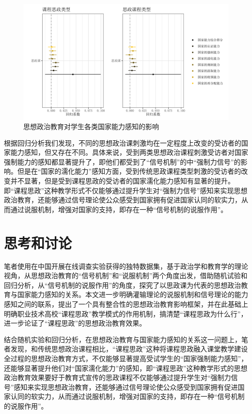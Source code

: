 \documentclass[
  12pt,
]{ctexart}
\begin{document}
\begin{figure}[h]
\includegraphics[width=1\linewidth]{../figures/all} \caption{思想政治教育对学生各类国家能力感知的影响}\label{fig:unnamed-chunk-4}
\end{figure}

根据回归分析我们发现，不同的思想政治课刺激均在一定程度上改变的受访者的国家能力感知，但又存在不同。具体来说，受到两类思想政治课程刺激受访者对国家强制能力的感知都显著提升了，即他们都受到了``信号机制''的中``强制力信号''的影响。但是在``国家的濡化能力''感知方面，受到传统思政课程类型刺激的受访者的改变并不显著，但是受到课程思政的受访者的国家濡化能力感知有显著的提升。即``课程思政''这种教学形式不仅能够通过提升学生对``强制力信号''感知来实现思想政治教育，还能够通过信号理论使公众感受到国家拥有促进国家认同的软实力，从而通过说服机制，增强对国家的支持，即存在一种``信号机制的说服作用''。

\hypertarget{ux601dux8003ux548cux8ba8ux8bba}{%
\section{思考和讨论}\label{ux601dux8003ux548cux8ba8ux8bba}}

笔者使用在中国开展在线调查实验获得的独特数据集，基于政治学和教育学的理论视角，从思想政治教育的``信号机制''和``说服机制''两个角度出发，借助随机试验和回归分析，从``信号机制的说服作用''的角度，探究了以思政课为代表的思想政治教育与国家能力感知的关系。本文进一步明确灌输理论的说服机制和信号理论的能力感知之间的联系，提出了一个具有整合性的思想政治教育影响框架，并在此基础上明确职业技术高校``课程思政''教学模式的作用机制，搞清楚``课程思政为什么行''，进一步论证了``课程思政''的思想政治教育效果。

结合随机实验和回归分析，在思想政治教育与国家能力感知的关系这一问题上，笔者发现，和传统思想政治课程相比，``课程思政''这种将课程思政融入课堂教学建设全过程的思想政治教育方式，不仅能够显著提高受试学生的``国家强制能力感知''，还能够显著提升他们对``国家濡化能力''的感知，即``课程思政''这种教学形式的思想政治教育效果要好于教育式宣传的思政课程不仅能够通过提升学生对``强制力信号''感知来实现思想政治教育，还能够通过信号理论使公众感受到国家拥有促进国家认同的软实力，从而通过说服机制，增强对国家的支持，即存在一种``信号机制的说服作用''。
\end{document}
